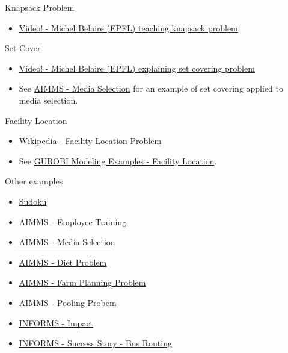 {\begin{resource}
Knapsack Problem
\begin{itemize}
\item \href{https://www.youtube.com/watch?v=GteOoMGUOdY}{Video! - Michel Belaire (EPFL) teaching knapsack problem}
\end{itemize}

Set Cover
\begin{itemize}
\item \href{https://www.youtube.com/watch?v=cjSeHSjPmsk}{Video! - Michel Belaire (EPFL) explaining set covering problem}
\item See \href{https://download.aimms.com/aimms/download/manuals/AIMMS3OM_MediaSelection.pdf}{AIMMS - Media Selection} for an example of set covering applied to media selection.
\end{itemize}

Facility Location
\begin{itemize}
\item \href{https://en.wikipedia.org/wiki/Facility_location_problem}{Wikipedia - Facility Location Problem}
\item See \href{https://github.com/Gurobi/modeling-examples/tree/master/facility_location}{GUROBI Modeling Examples - Facility Location}.
\end{itemize}


{Other examples}
\begin{itemize}
\item \href{https://www.juliaopt.org/notebooks/JuMP-Sudoku.html}{Sudoku}
\item \href{https://download.aimms.com/aimms/download/manuals/AIMMS3OM_EmployeeTraining.pdf}{AIMMS - Employee Training}

\item \href{https://download.aimms.com/aimms/download/manuals/AIMMS3OM_MediaSelection.pdf}{AIMMS - Media Selection}

\item \href{https://download.aimms.com/aimms/download/manuals/AIMMS3OM_Diet.pdf}{AIMMS - Diet Problem}

\item \href{https://download.aimms.com/aimms/download/manuals/AIMMS3OM_FarmPlanning.pdf}{AIMMS - Farm Planning Problem}

\item \href{https://download.aimms.com/aimms/download/manuals/AIMMS3OM_Pooling.pdf}{AIMMS - Pooling Probem}

\item \href{https://www.informs.org/Impact}{INFORMS - Impact}
\item \href{https://www.informs.org/Impact/O.R.-Analytics-Success-Stories/Optimized-school-bus-routing-helps-school-districts-design-better-policies}{INFORMS - Success Story - Bus Routing}
\end{itemize}


\end{resource}}

